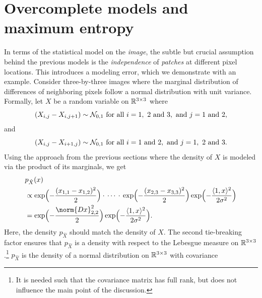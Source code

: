 \section{Overcomplete models and maximum entropy}%
\label{sec:overcompleteness through convolution}
In terms of the statistical model on the \emph{image}, the subtle but crucial assumption behind the previous models is the \emph{independence} of \emph{patches} at different pixel locations.
This introduces a modeling error, which we demonstrate with an example.
Consider three-by-three images where the marginal distribution of differences of neighboring pixels follow a normal distribution with unit variance.
Formally, let \( X \) be a random variable on \( \R^{\numproduct{3x3}} \) where
\begin{equation}
	(X_{i, j} - X_{i, j + \num{1}}) \sim \NormalDistribution_{\num{0},\num{1}}\ \text{for all}\ i = \numlist{1;2;3},\ \text{and}\ j=\numlist{1;2},
\end{equation}
and
\begin{equation}
	(X_{i, j} - X_{i + \num{1}, j}) \sim \NormalDistribution_{\num{0}, \num{1}}\ \text{for all}\ i = \numlist{1;2},\ \text{and}\ j=\numlist{1;2;3}.
\end{equation}
Using the approach from the previous sections where the density of \( X \) is modeled via the product of its marginals, we get
\begin{equation}
	\begin{aligned}
		&p_{\hat{X}}(x) \\
		&\propto \exp\Bigl( -\frac{(x_{\num{1},\num{1}} - x_{\num{1},\num{2}})^{\num{2}}}{\num{2}} \Bigr)\cdot\,\cdots\,\cdot\,\exp\Bigl( -\frac{(x_{\num{2},\num{3}} - x_{\num{3},\num{3}})^{\num{2}}}{\num{2}} \Bigr) \exp\Bigl( -\frac{\inprod{\num{1}}{x}^{\num{2}}}{\num{2}\sigma^{\num{2}}} \Bigr)\\
		&=\exp\Bigl( -\frac{\norm{\DiffOp x}_{\num{2},\num{2}}^{\num{2}}}{\num{2}} \Bigr)\exp\Bigl( -\frac{\inprod{1}{x}^{\num{2}}}{\num{2}\sigma^{\num{2}}} \Bigr).
	\end{aligned}
\end{equation}
Here, the density \( p_{\hat{X}} \) should match the density of \( X \).
The second tie-breaking factor ensures that \( p_{\hat{X}} \) is a density with respect to the Lebesgue measure on \( \R^{\numproduct{3x3}} \).\footnote{%
	It is needed such that the covariance matrix has full rank, but does not influence the main point of the discussion.
}
\( p_{\hat{X}} \) is the density of a normal distribution on \( \R^{\numproduct{3x3}} \) with covariance
